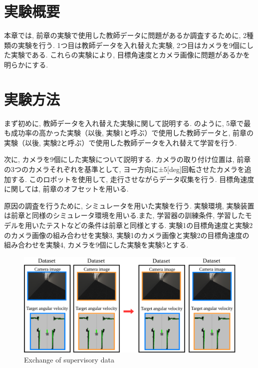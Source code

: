 
\section{実験概要}
本章では, 前章の実験で使用した教師データに問題があるか調査するために, 2種類の実験を行う. 1つ目は教師データを入れ替えた実験, 2つ目はカメラを9個にした実験である. これらの実験により, 目標角速度とカメラ画像に問題があるかを明らかにする. 

\section{実験方法}
まず初めに, 教師データを入れ替えた実験に関して説明する. のように, 5章で最も成功率の高かった実験（以後, 実験1と呼ぶ）で使用した教師データと, 前章の実験（以後, 実験2と呼ぶ）で使用した教師データを入れ替えて学習を行う.
\par 次に, カメラを9個にした実験について説明する. カメラの取り付け位置は, 前章の3つのカメラそれぞれを基準として, ヨー方向に±5[deg]回転させたカメラを追加する. このロボットを使用して, 走行させながらデータ収集を行う. 目標角速度に関しては, 前章のオフセットを用いる. 
\par 原因の調査を行うために, シミュレータを用いた実験を行う. 実験環境, 実験装置は前章と同様のシミュレータ環境を用いる.また, 学習器の訓練条件, 学習したモデルを用いたテストなどの条件は前章と同様とする. 実験1の目標角速度と実験2のカメラ画像の組み合わせを実験3, 実験1のカメラ画像と実験2の目標角速度の組み合わせを実験4, カメラを9個にした実験を実験5とする. 

\begin{figure}[h]
  \centering
  \includegraphics[keepaspectratio, scale=0.22]{images/change.png}
  \caption{Exchange of supervisory data}
  \label{Fig:change}
\end{figure}

\newpage
